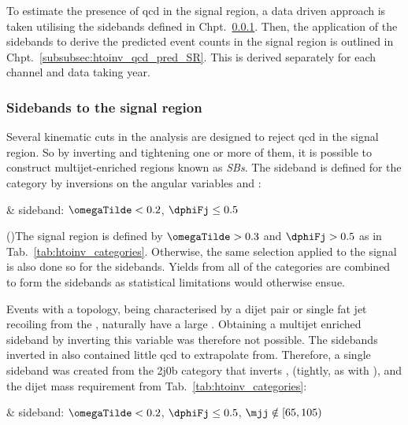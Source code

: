 To estimate the presence of \acrshort{qcd} in the signal region, a data driven approach is taken utilising the sidebands defined in Chpt.~\ref{subsubsec:htoinv_sidebands}. Then, the application of the sidebands to derive the predicted event counts in the signal region is outlined in Chpt.~\ref{subsubsec:htoinv_qcd_pred_SR}. This is derived separately for each channel and data taking year.




\subsubsection{Sidebands to the signal region}
\label{subsubsec:htoinv_sidebands}

Several kinematic cuts in the analysis are designed to reject \acrshort{qcd} in the signal region. So by inverting and tightening one or more of them, it is possible to construct multijet-enriched regions known as \emph{\glspl{SB}}. The sideband is defined for the \ttH category by inversions on the angular variables \omegaTilde and \dphiFj:

\medskip
\begin{easylist}[itemize]
    \easylistprops
    & \ttH sideband: $\omegaTilde < \text{0.2}$, $\dphiFj \leq \text{0.5}$
\end{easylist}

\medskip

\noindent()The signal region is defined by $\omegaTilde > \text{0.3}$ and $\dphiFj > \text{0.5}$ as in Tab.~\ref{tab:htoinv_categories}. Otherwise, the same selection applied to the signal is also done so for the sidebands. Yields from all of the \ttH categories are combined to form the sidebands as statistical limitations would otherwise ensue.

Events with a \VH topology, being characterised by a dijet pair or single fat jet recoiling from the \ptvecmiss, naturally have a large \mindphiJetMet. Obtaining a multijet enriched sideband by inverting this variable was therefore not possible. The sidebands inverted in \omegaTilde also contained little \acrshort{qcd} to extrapolate from. Therefore, a single sideband was created from the 2j0b category that inverts \mindphi, \omegaTilde (tightly, as with \ttH), and the dijet mass requirement from Tab.~\ref{tab:htoinv_categories}:

\medskip
\begin{easylist}[itemize]
    \easylistprops
    & \VH sideband: $\omegaTilde < \text{0.2}$, $\dphiFj \leq \text{0.5}$, $\mjj \notin [\text{65}, \text{105})$
\end{easylist}

